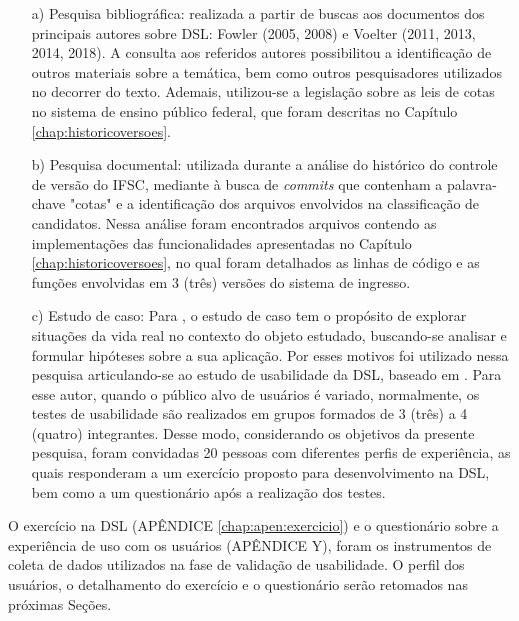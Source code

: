 \begin{enumerate}
    \item[a)] Pesquisa bibliográfica: realizada a partir de buscas aos documentos dos principais autores sobre \gls{DSL}: Fowler (2005, 2008) e Voelter (2011, 2013, 2014, 2018). A consulta aos referidos autores possibilitou a identificação de outros materiais sobre a temática, bem como outros pesquisadores utilizados no decorrer do texto. Ademais, utilizou-se a legislação sobre as leis de cotas no sistema de ensino público federal, que foram descritas no Capítulo \ref{chap:historicoversoes}. 

    
    \item[b)] Pesquisa documental: utilizada durante a análise do histórico do controle de versão do \gls{IFSC}, mediante à busca de \textit{commits} que contenham a palavra-chave "cotas" e a identificação dos arquivos envolvidos na classificação de candidatos. Nessa análise foram encontrados arquivos contendo as implementações das funcionalidades apresentadas no Capítulo \ref{chap:historicoversoes}, no qual foram detalhados as linhas de código e as funções envolvidas em 3 (três) versões do sistema de ingresso. 
    
    \item[c)] Estudo de caso: Para , o estudo de caso tem o propósito de explorar situações da vida real no contexto do objeto estudado, buscando-se analisar e formular hipóteses sobre a sua aplicação. Por esses motivos foi utilizado nessa pesquisa articulando-se ao estudo de usabilidade da \gls{DSL}, baseado em . Para esse autor, quando o público alvo de usuários é variado, normalmente, os testes de usabilidade são realizados em grupos formados de 3 (três) a 4 (quatro) integrantes. Desse modo, considerando os objetivos da presente pesquisa, foram convidadas 20 pessoas com diferentes perfis de experiência, as quais responderam a um exercício proposto para desenvolvimento na \gls{DSL}, bem como a um questionário após a realização dos testes. 
    
\end{enumerate}

    O exercício na DSL (APÊNDICE \ref{chap:apen:exercicio}) e o questionário sobre a experiência de uso com os usuários (APÊNDICE Y), foram os instrumentos de coleta de dados utilizados na fase de validação de usabilidade. O perfil dos usuários, o detalhamento do exercício e o questionário serão retomados nas próximas Seções.
    
